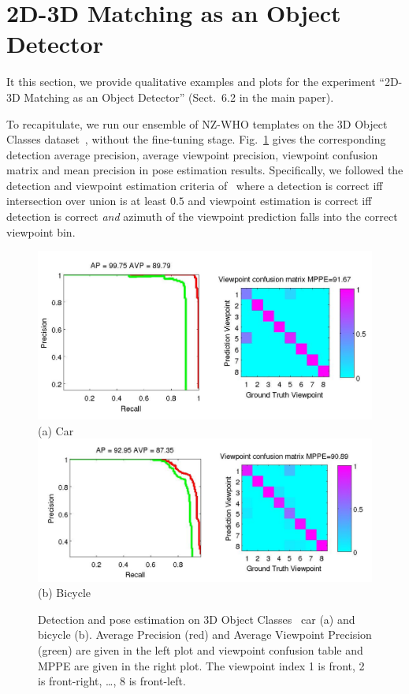 \documentclass[10pt,twocolumn,letterpaper]{article}
\begin{document}
\section{2D-3D Matching as an Object Detector}
\label{sect:3dobject}
It this section, we provide qualitative examples and plots for the experiment
``2D-3D Matching as an Object Detector'' (Sect.~6.2 in the main
paper).

To recapitulate, we run our ensemble
of NZ-WHO templates on the 3D Object Classes
dataset~\cite{savarese07}, without the fine-tuning
stage. Fig.~\ref{fig:3dobject_ap} gives the corresponding detection
average precision, average viewpoint precision, viewpoint confusion
matrix and mean precision in pose estimation results. Specifically, we
followed the detection and viewpoint estimation criteria
of~\cite{Xiang12} where a detection is correct iff
intersection over union is at least $0.5$ and viewpoint estimation is
correct iff detection is correct \emph{and} azimuth of the viewpoint
prediction falls into the correct viewpoint bin.
%
\begin{figure}[h]
  \centering
  \includegraphics[width=0.99\linewidth]{supp/car_ap_3dobject_tight.png}\\
  \vspace{-5pt}
    (a) Car\\
  \includegraphics[width=0.99\linewidth]{supp/bicycle_ap_3dobject_tight.png}\\
  \vspace{-5pt}
    (b) Bicycle\\
  \caption{Detection and pose estimation on 3D Object
    Classes~\cite{savarese07} car (a) and bicycle (b).
    Average Precision (red) and Average Viewpoint Precision (green)
    are given in the left plot and viewpoint confusion table and MPPE
    are given in the right plot. The viewpoint index 1 is front, 2 is
    front-right, \dots, 8 is front-left.}
  \label{fig:3dobject_ap}
\end{figure}
\end{document}
